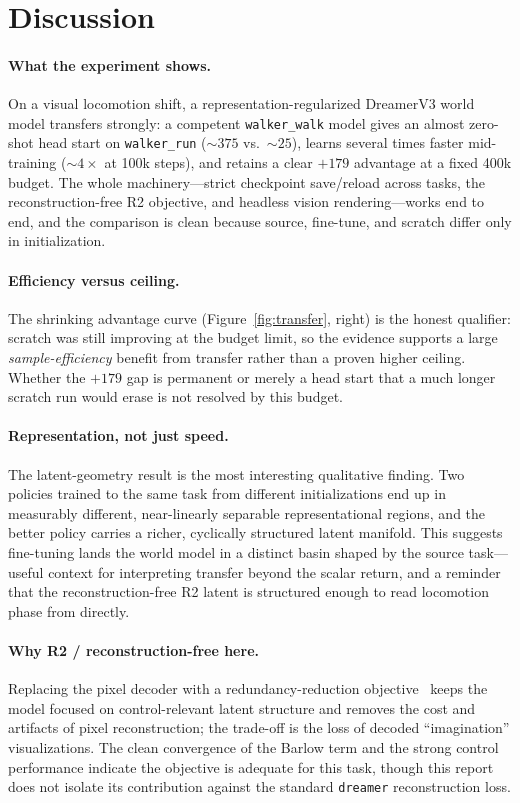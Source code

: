 \documentclass[11pt]{article}
\begin{document}
\section{Discussion}

\paragraph{What the experiment shows.} On a visual locomotion shift, a
representation-regularized DreamerV3 world model transfers strongly: a competent
\texttt{walker\_walk} model gives an almost zero-shot head start on
\texttt{walker\_run} ($\sim\!375$ vs.\ $\sim\!25$), learns several times faster
mid-training ($\sim\!4\times$ at 100k steps), and retains a clear $+179$
advantage at a fixed 400k budget. The whole machinery---strict checkpoint
save/reload across tasks, the reconstruction-free R2 objective, and headless
vision rendering---works end to end, and the comparison is clean because source,
fine-tune, and scratch differ only in initialization.

\paragraph{Efficiency versus ceiling.} The shrinking advantage curve
(Figure~\ref{fig:transfer}, right) is the honest qualifier: scratch was still
improving at the budget limit, so the evidence supports a large
\emph{sample-efficiency} benefit from transfer rather than a proven higher
ceiling. Whether the $+179$ gap is permanent or merely a head start that a much
longer scratch run would erase is not resolved by this budget.

\paragraph{Representation, not just speed.} The latent-geometry result is the
most interesting qualitative finding. Two policies trained to the same task from
different initializations end up in measurably different, near-linearly
separable representational regions, and the better policy carries a richer,
cyclically structured latent manifold. This suggests fine-tuning lands the world
model in a distinct basin shaped by the source task---useful context for
interpreting transfer beyond the scalar return, and a reminder that the
reconstruction-free R2 latent is structured enough to read locomotion phase
from directly.

\paragraph{Why R2 / reconstruction-free here.} Replacing the pixel decoder with
a redundancy-reduction objective~\cite{barlow,dreamerpro} keeps the model
focused on control-relevant latent structure and removes the cost and artifacts
of pixel reconstruction; the trade-off is the loss of decoded
``imagination'' visualizations. The clean convergence of the Barlow term and the
strong control performance indicate the objective is adequate for this task,
though this report does not isolate its contribution against the standard
\texttt{dreamer} reconstruction loss.
\end{document}
